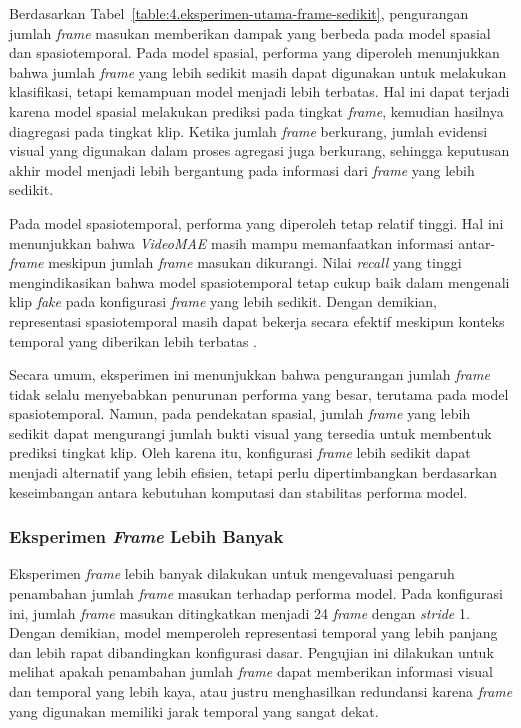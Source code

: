Berdasarkan Tabel~\ref{table:4.eksperimen-utama-frame-sedikit}, pengurangan jumlah \textit{frame} masukan memberikan dampak yang berbeda pada model spasial dan spasiotemporal. Pada model spasial, performa yang diperoleh menunjukkan bahwa jumlah \textit{frame} yang lebih sedikit masih dapat digunakan untuk melakukan klasifikasi, tetapi kemampuan model menjadi lebih terbatas. Hal ini dapat terjadi karena model spasial melakukan prediksi pada tingkat \textit{frame}, kemudian hasilnya diagregasi pada tingkat klip. Ketika jumlah \textit{frame} berkurang, jumlah evidensi visual yang digunakan dalam proses agregasi juga berkurang, sehingga keputusan akhir model menjadi lebih bergantung pada informasi dari \textit{frame} yang lebih sedikit.

Pada model spasiotemporal, performa yang diperoleh tetap relatif tinggi. Hal ini menunjukkan bahwa \textit{VideoMAE} masih mampu memanfaatkan informasi antar-\textit{frame} meskipun jumlah \textit{frame} masukan dikurangi. Nilai \textit{recall} yang tinggi mengindikasikan bahwa model spasiotemporal tetap cukup baik dalam mengenali klip \textit{fake} pada konfigurasi \textit{frame} yang lebih sedikit. Dengan demikian, representasi spasiotemporal masih dapat bekerja secara efektif meskipun konteks temporal yang diberikan lebih terbatas \cite{Gu2021}\cite{tong2022videomaemaskedautoencodersdataefficient}.

Secara umum, eksperimen ini menunjukkan bahwa pengurangan jumlah \textit{frame} tidak selalu menyebabkan penurunan performa yang besar, terutama pada model spasiotemporal. Namun, pada pendekatan spasial, jumlah \textit{frame} yang lebih sedikit dapat mengurangi jumlah bukti visual yang tersedia untuk membentuk prediksi tingkat klip. Oleh karena itu, konfigurasi \textit{frame} lebih sedikit dapat menjadi alternatif yang lebih efisien, tetapi perlu dipertimbangkan berdasarkan keseimbangan antara kebutuhan komputasi dan stabilitas performa model.

\subsubsection{Eksperimen \textit{Frame} Lebih Banyak} \label{IV.Eksperimen_Utama_Frame_Banyak}

Eksperimen \textit{frame} lebih banyak dilakukan untuk mengevaluasi pengaruh penambahan jumlah \textit{frame} masukan terhadap performa model. Pada konfigurasi ini, jumlah \textit{frame} masukan ditingkatkan menjadi 24 \textit{frame} dengan \textit{stride} 1. Dengan demikian, model memperoleh representasi temporal yang lebih panjang dan lebih rapat dibandingkan konfigurasi dasar. Pengujian ini dilakukan untuk melihat apakah penambahan jumlah \textit{frame} dapat memberikan informasi visual dan temporal yang lebih kaya, atau justru menghasilkan redundansi karena \textit{frame} yang digunakan memiliki jarak temporal yang sangat dekat.

